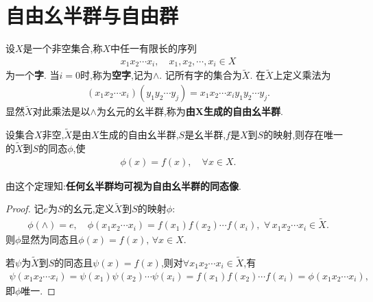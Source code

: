 \documentclass[../../main.tex]{subfiles}%
\begin{document}
\section{自由幺半群与自由群}

\begin{definition}[自由幺半群]
设$X$是一个非空集合,称$X$中任一有限长的序列
\begin{align*}
x_1x_2\cdots x_i,\quad x_1,x_2,\cdots,x_i\in X
\end{align*}
为一个\textbf{字}. 当$i=0$时,称为\textbf{空字},记为$\land$. 记所有字的集合为$\widetilde{X}$. 在$\widetilde{X}$上定义乘法为
\begin{align*}
(x_1x_2\cdots x_i)(y_1y_2\cdots y_j) = x_1x_2\cdots x_iy_1y_2\cdots y_j.
\end{align*}
显然$\widetilde{X}$对此乘法是以$\land$为幺元的幺半群,称为\textbf{由$\boldsymbol{X}$生成的自由幺半群}.
\end{definition}

\begin{theorem}\label{theorem:抽象代数--定理4.8.1}
设集合$X$非空,$\widetilde{X}$是由$X$生成的自由幺半群,$S$是幺半群,$f$是$X$到$S$的映射,则存在唯一的$\widetilde{X}$到$S$的同态$\phi$,使
\begin{align*}
\phi(x) = f(x),\quad \forall x\in X.
\end{align*}
\end{theorem}
\begin{remark}
由这个定理知:\textbf{任何幺半群均可视为自由幺半群的同态像}.
\end{remark}
\begin{proof}

记$e$为$S$的幺元,定义$\widetilde{X}$到$S$的映射$\phi$:
\begin{align*}
\phi(\land)=e,\quad \phi(x_1x_2\cdots x_i)=f(x_1)f(x_2)\cdots f(x_i),\,\,\forall \, x_1x_2\cdots x_i\in \widetilde{X}.
\end{align*}
则$\phi$显然为同态且$\phi(x) = f(x),\,\forall x\in X.$

若$\psi$为$\widetilde{X}$到$S$的同态且$\psi(x)=f(x)$,则对$\forall x_1x_2\cdots x_i\in \widetilde{X}$,有
\begin{align*}
\psi(x_1x_2\cdots x_i) = \psi(x_1)\psi(x_2)\cdots \psi(x_i) = f(x_1)f(x_2)\cdots f(x_i) = \phi(x_1x_2\cdots x_i),
\end{align*}
即$\phi$唯一.

\end{proof}
\end{document}
